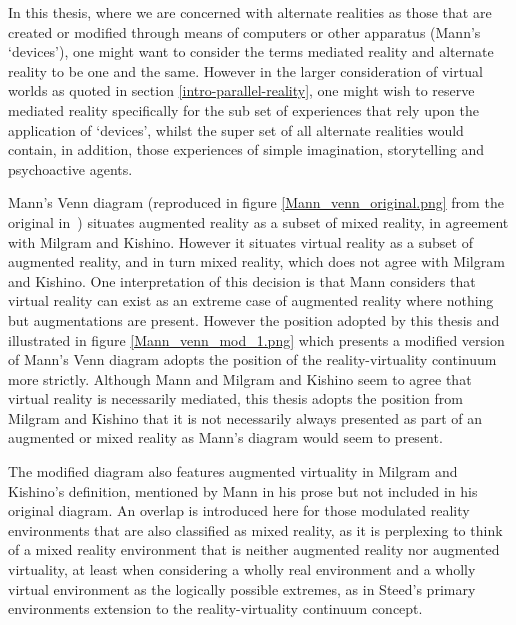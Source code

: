 
In this thesis, where we are concerned with alternate realities as those that are created or modified through means of computers or other apparatus (Mann's `devices'), one might want to consider the terms mediated reality and alternate reality to be one and the same. However in the larger consideration of virtual worlds as quoted in section \ref{intro-parallel-reality}, one might wish to reserve mediated reality specifically for the sub set of experiences that rely upon the application of `devices', whilst the super set of all alternate realities would contain, in addition, those experiences of simple imagination, storytelling and psychoactive agents.

Mann's Venn diagram (reproduced in figure \ref{Mann_venn_original.png} from the original in~\cite{Mann2002a}) situates augmented reality as a subset of mixed reality, in agreement with Milgram and Kishino. However it situates virtual reality as a subset of augmented reality, and in turn mixed reality, which does not agree with Milgram and Kishino. One interpretation of this decision is that Mann considers that virtual reality can exist as an extreme case of augmented reality where nothing but augmentations are present. However the position adopted by this thesis and illustrated in figure \ref{Mann_venn_mod_1.png} which presents a modified version of Mann's Venn diagram adopts the position of the reality-virtuality continuum more strictly. Although Mann and Milgram and Kishino seem to agree that virtual reality is necessarily mediated, this thesis adopts the position from Milgram and Kishino that it is not necessarily always presented as part of an augmented or mixed reality as Mann's diagram would seem to present.


The modified diagram also features augmented virtuality in Milgram and Kishino's definition, mentioned by Mann in his prose but not included in his original diagram. An overlap is introduced here for those modulated reality environments that are also classified as mixed reality, as it is perplexing to think of a mixed reality environment that is neither augmented reality nor augmented virtuality, at least when considering a wholly real environment and a wholly virtual environment as the logically possible extremes, as in Steed's primary environments extension to the reality-virtuality continuum concept.

